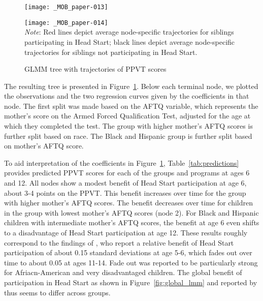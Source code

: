 \documentclass[doc,floatsintext,natbib]{apa7}
\begin{document}
\begin{figure}%
\caption{GLMM tree with trajectories of PPVT scores}
\texttt{[image: \_MOB\_paper-013]}

\vspace*{-3cm}

\texttt{[image: \_MOB\_paper-014]}
\\\textit{Note}: Red lines depict average node-specific trajectories for siblings participating in Head Start; black lines depict average node-specific trajectories for siblings not participating in Head Start.
\label{fig:lmm_tree}
\end{figure}%

The resulting tree is presented in Figure~\ref{fig:lmm_tree}. Below each terminal node, we plotted the observations and the two regression curves given by the coefficients in that node. The first split was made based on the AFTQ variable, which represents the mother's score on the Armed Forced Qualification Test, adjusted for the age at which they completed the test. The group with higher mother's AFTQ scores is further split based on race. The Black and Hispanic group is further split based on mother's AFTQ score. 


To aid interpretation of the coefficients in Figure~\ref{fig:lmm_tree}, Table~\ref{tab:predictions} provides predicted PPVT scores for each of the groups and programs at ages 6 and 12. All nodes show a modest benefit of Head Start participation at age 6, about 3-4 points on the PPVT. This benefit increases over time for the group with higher mother's AFTQ scores. The benefit decreases over time for children in the group with lowest mother's AFTQ scores (node 2). For Black and Hispanic children with intermediate mother's AFTQ scores, the benefit at age 6 even shifts to a disadvantage of Head Start participation at age 12. These results roughly correspond to the findings of \cite{Demi09}, who report a relative benefit of Head Start participation of about 0.15 standard deviations at age 5-6, which fades out over time to about 0.05 at ages 11-14. Fade out was reported to be particularly strong for Afriacn-American and very disadvantaged children. The global benefit of participation in Head Start as shown in Figure~\ref{fig:global_lmm} and reported by \cite{Demi09} thus seems to differ across groups.
\end{document}
